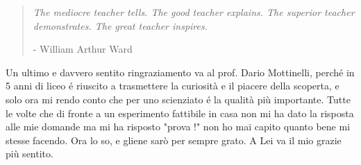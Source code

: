 \blockquote{
\emph{The mediocre teacher tells. The good teacher explains. The superior teacher demonstrates. The great teacher inspires.}
\begin{flushright}
- William Arthur Ward
\end{flushright}
}%
Un ultimo e davvero sentito ringraziamento va al prof. Dario Mottinelli, perché in 5 anni di liceo é riuscito a trasmettere la curiosit\`a e il piacere della scoperta, e solo ora mi rendo conto che per uno scienziato é la qualit\`a pi\`u importante. Tutte le volte che di fronte a un esperimento fattibile in casa non mi ha dato la risposta alle mie domande ma mi ha risposto "prova !" non ho mai capito quanto bene mi stesse facendo. Ora lo so, e gliene sar\`o per sempre grato. A Lei va il mio grazie pi\`u sentito.